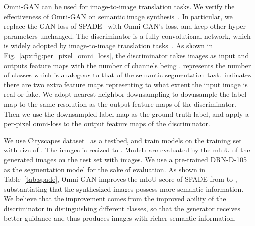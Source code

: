\documentclass[paper_2425.tex]{subfiles}
\begin{document}
\begin{table*}[t]
{\begin{tabular}{ccccccccccc}
                                                     &        &            &            &        &         &        &                 &                &              &  \\
      \bottomrule
    \end{tabular}}
  \vspace{-0.2cm}
  \caption{Semantic image synthesis using SPADE. Replacing the GAN used by SPADE with Omni-GAN can improve the quality of synthesized images.}
  \vspace{-0.4cm}
  \label{tab:spade}
\end{table*}


Omni-GAN can be used for image-to-image translation tasks. We verify the effectiveness of Omni-GAN on semantic image synthesis~\cite{wang2018VideotoVideo,qi2018Semiparametric}. In particular, we replace the GAN loss of SPADE~\cite{park2019Semantic} with Omni-GAN's loss, and keep other hyper-parameters unchanged.
The discriminator is a fully convolutional network, which is widely adopted by image-to-image translation tasks~\cite{park2019Semantic,isola2017ImagetoImage,wang2018HighResolution}. As shown in Fig.~\ref{apx:fig:per_pixel_omni_loss}, the discriminator takes images as input and outputs feature maps with the number of channels being .  represents the number of classes which is analogous to that of the semantic segmentation task.  indicates there are two extra feature maps representing to what extent the input image is real or fake. We adopt nearest neighbor downsampling to downsample the label map to the same resolution as the output feature maps of the discriminator. Then we use the downsampled label map as the ground truth label, and apply a per-pixel omni-loss to the output feature maps of the discriminator.

We use Cityscapes dataset~\cite{cordts2016Cityscapes} as a testbed, and train models on the training set with size of . The images is resized to . Models are evaluated by the mIoU of the generated images on the test set with  images. We use a pre-trained DRN-D-105~\cite{yu2017Dilated} as the segmentation model for the sake of evaluation. As shown in Table~\ref{tab:spade}, Omni-GAN improves the mIoU score of SPADE from  to , substantiating that the synthesized images possess more semantic information. We believe that the improvement comes from the improved ability of the discriminator in distinguishing different classes, so that the generator receives better guidance and thus produces images with richer semantic information.
\end{document}
